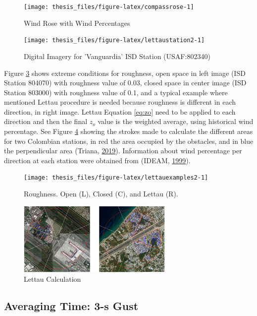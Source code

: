 \documentclass[12pt,twoside]{reedthesis}
\begin{document}
\begin{figure}

{\centering \texttt{[image: thesis\_files/figure-latex/compassrose-1]} 

}

\caption{Wind Rose with Wind Percentages}\label{fig:compassrose}
\end{figure}
\footnotesize
\begin{figure}

{\centering \texttt{[image: thesis\_files/figure-latex/lettaustation2-1]} 

}

\caption{Digital Imagery for 'Vanguardia' ISD Station (USAF:802340)}\label{fig:lettaustation2}
\end{figure}
\normalsize

Figure \ref{fig:lettauexamples2} shows extreme conditions for roughness, open space in left image (ISD Station 804070) with roughness value of 0.03, closed space in center image (ISD Station 803000) with roughness value of 0.1, and a typical example where mentioned Lettau procedure is needed because roughness is different in each direction, in right image. Lettau Equation \eqref{eq:zo} need to be applied to each direction and then the final \(z_o\) value is the weighted average, using historical wind percentage. See Figure \ref{fig:lettauvalues} showing the strokes made to calculate the different areas for two Colombian stations, in red the area occupied by the obstacles, and in blue the perpendicular area (Triana, \protect\hyperlink{ref-triana2019}{2019}). Information about wind percentage per direction at each station were obtained from (IDEAM, \protect\hyperlink{ref-ideam1999}{1999}).
\begin{figure}

{\centering \texttt{[image: thesis\_files/figure-latex/lettauexamples2-1]} 

}

\caption{Roughness. Open (L), Closed (C), and Lettau (R).}\label{fig:lettauexamples2}
\end{figure}
\begin{figure}

{\centering \includegraphics[width=2.97in]{figure/lettauvalues} 

}

\caption{Lettau Calculation}\label{fig:lettauvalues}
\end{figure}
\hypertarget{rmd-gust}{%
\subsection{Averaging Time: 3-s Gust}\label{rmd-gust}}
\end{document}
